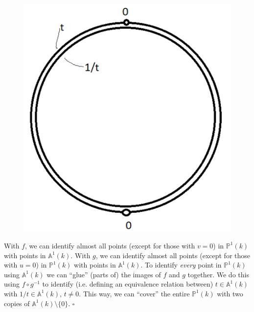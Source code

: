 \documentclass[12pt]{article}
\begin{document}
\begin{enumerate}[(a)]
	
	\begin{figure}[!htb]
		\centering
		\includegraphics[scale=0.2]{img}
	\end{figure}




	With $f$, we can identify almost all points (except for those with $v=0$) in $\mathbb{P}^1(k)$ with points in $\mathbb{A}^1(k)$. With $g$, we can identify almost all points (except for those with $u=0$) in $\mathbb{P}^1(k)$ with points in $\mathbb{A}^1(k)$. To identify \textit{every} point in $\mathbb{P}^1(k)$ using $\mathbb{A}^1(k)$ we can ``glue'' (parts of) the images of $f$ and $g$ together. We do this using $f\circ g^{-1}$ to identify (i.e. defining an equivalence relation between) $t \in \mathbb{A}^{1}(k)$ with $1/t \in \mathbb{A}^1(k)$, $t\neq 0$. This way, we can ``cover'' the entire $\mathbb{P}^1(k)$ with two copies of $\mathbb{A}^1(k)\setminus\{0\}$.  \hfill$\square$ 
\end{enumerate}





\newpage
\end{document}
